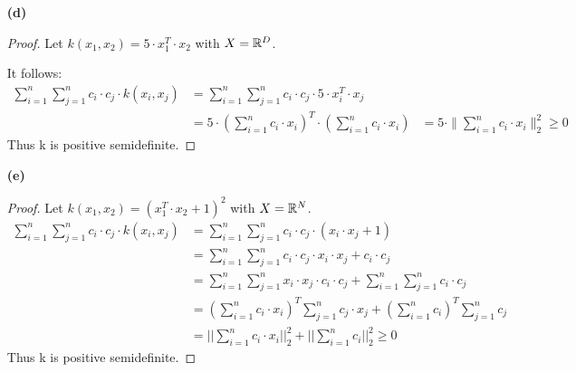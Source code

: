 \begin{itemize}
    		\item[\textbf{(d)}] 
    		\begin{proof}
    			Let $k(x_1,x_2)= 5 \cdot x_1^T \cdot x_2$ with $X = \mathbb{R}^D$. 
    			
    			It follows:
    				\begin{align*}
    					\sum_{i=1}^n\sum_{j=1}^n c_i \cdot c_j \cdot k(x_i, x_j)
    					&=\sum_{i=1}^n\sum_{j=1}^n c_i \cdot c_j \cdot 5 \cdot x_i^T \cdot x_j  \\
    					&=5\cdot (\sum_{i=1}^n c_i \cdot x_i)^T  \cdot (\sum_{i=1}^n c_i \cdot x_i) 
    					&=5\cdot \|\sum_{i=1}^n c_i \cdot x_i\|_2^2 \geq 0
    				\end{align*}
    				Thus k is positive semidefinite.
    		\end{proof}
    		
    		\item[\textbf{(e)}] 
    		\begin{proof}
    			Let $k(x_1,x_2)= (x_1^T \cdot x_2 + 1)^2$ with $X = \mathbb{R}^N$. 
    			\begin{align*}
    				\sum_{i=1}^n\sum_{j=1}^n c_i \cdot c_j \cdot k(x_i,x_j)   
    				&= \sum_{i=1}^n\sum_{j=1}^n c_i \cdot c_j \cdot (x_i \cdot x_j+1) \\
                  &= \sum_{i=1}^n\sum_{j=1}^n c_i \cdot c_j \cdot x_i \cdot x_j + c_i \cdot c_j\\
                  &= \sum_{i=1}^n\sum_{j=1}^nx_i \cdot x_j \cdot c_i \cdot c_j + \sum_{i=1}^n\sum_{j=1}^nc_ i \cdot c_j \\
                  &=(\sum_{i=1}^nc_i \cdot x_i)^T\sum_{j=1}^nc_j \cdot x_j + (\sum_{i=1}^nc_i)^T\sum_{j=1}^nc_j \\
                  &=||\sum_{i=1}^nc_i \cdot x_i||_2^2+||\sum_{i=1}^nc_i||_2^2 \geq 0
			\end{align*}
			Thus k is positive semidefinite.

		\end{proof}
\end{itemize}